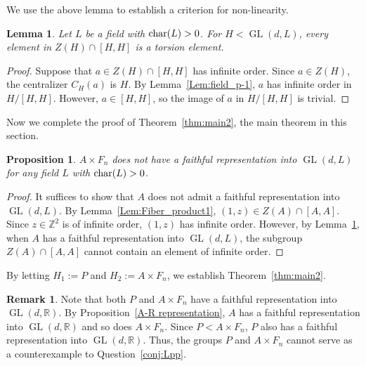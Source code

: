 \documentclass[11pt]{amsart}
\newtheorem{lem}[thm]{Lemma}
\newtheorem{prop}[thm]{Proposition}
\theoremstyle{definition}
\newtheorem{rmk}[thm]{Remark}
\DeclareMathOperator{\GL}{GL}
\newcommand{\ZZ}{\mathbb{Z}}
\newcommand{\RR}{\mathbb{R}}
\begin{document}
 We use the above lemma to establish a criterion for non-linearity.

\begin{lem} \label{Lem:Obstruction1}
 Let $L$ be a field with $\textnormal{char}(L)>0$.
 For $H < \GL(d,L)$, every element in $Z(H) \cap [H,H]$ is a torsion element.
\end{lem}
\begin{proof}
 Suppose that $a \in Z(H) \cap [H,H]$ has infinite order. Since $a \in Z(H)$, the centralizer $C_H(a)$ is $H$.
 By Lemma~\ref{Lem:field_p-1}, $a$ has infinite order in $H/[H,H]$.
 However, $a \in [H,H]$, so the image of $a$ in $H/[H,H]$ is trivial.
\end{proof}

 Now we complete the proof of Theorem~\ref{thm:main2}, the main theorem in this section.

\begin{prop}
 $A \times F_n$ does not have a faithful representation into $\GL(d,L)$ for any field $L$ with $\textnormal{char}(L)>0$.
\end{prop}
\begin{proof}
 It suffices to show that $A$ does not admit a faithful representation into $\GL(d,L)$.
 By Lemma~\ref{Lem:Fiber_product1}, $(1,z) \in Z(A) \cap [A,A]$.
 Since $z \in \ZZ^2$ is of infinite order, $(1,z)$ has infinite order.
 However, by Lemma~\ref{Lem:Obstruction1}, when $A$ has a faithful representation into $\GL(d,L)$,
 the subgroup $Z(A) \cap [A,A]$ cannot contain an element of infinite order.
\end{proof}

 By letting $H_1:=P$ and $H_2:=A \times F_n$, we establish Theorem~\ref{thm:main2}.

\begin{rmk}
 Note that both $P$ and $A \times F_n$ have a faithful representation into $\GL(d,\RR)$.
 By Proposition~\ref{A-R representation}, $A$ has a faithful representation into $\GL(d,\RR)$ and so does $A \times F_n$.
 Since $P< A \times F_n$, $P$ also has a faithful representation into $\GL(d,\RR)$.
 Thus, the groups $P$ and $A \times F_n$ cannot serve as a counterexample to Question~\ref{conj:Lpp}.
\end{rmk}




\end{document}
